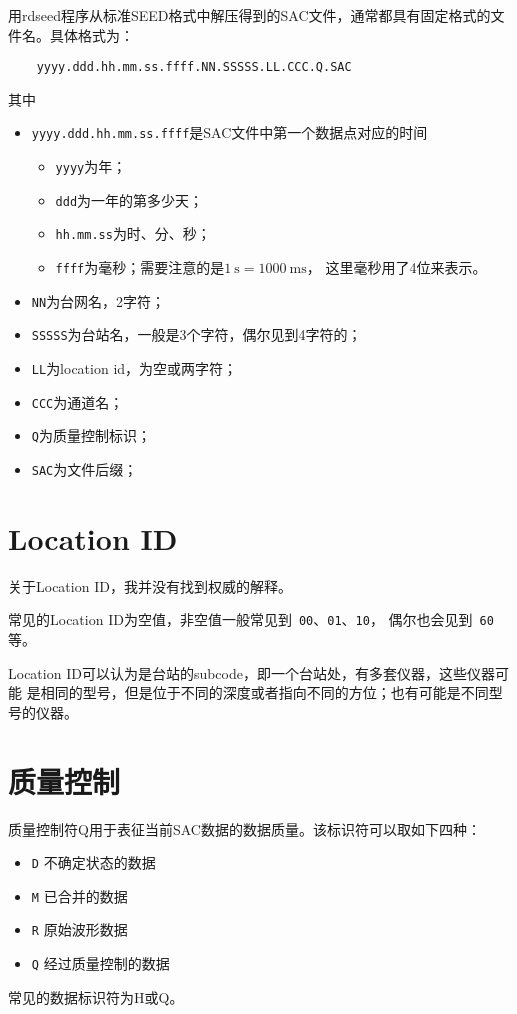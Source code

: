 用rdseed程序从标准SEED格式中解压得到的SAC文件，通常都具有固定格式的文件名。具体格式为：
\begin{verbatim}
    yyyy.ddd.hh.mm.ss.ffff.NN.SSSSS.LL.CCC.Q.SAC
\end{verbatim}
其中
\begin{itemize}
\item \verb+yyyy.ddd.hh.mm.ss.ffff+是SAC文件中第一个数据点对应的时间
    \begin{itemize}
    \item \verb+yyyy+为年；
    \item \verb+ddd+为一年的第多少天；
    \item \verb+hh.mm.ss+为时、分、秒；
    \item \verb+ffff+为毫秒；需要注意的是$\SI{1}{\s}=\SI{1000}{\ms}$，
        这里毫秒用了4位来表示。
    \end{itemize}
\item \verb+NN+为台网名，2字符；
\item \verb+SSSSS+为台站名，一般是3个字符，偶尔见到4字符的；
\item \verb+LL+为location id，为空或两字符；
\item \verb+CCC+为通道名；
\item \verb+Q+为质量控制标识；
\item \verb+SAC+为文件后缀；
\end{itemize}

\section{Location ID}
关于Location ID，我并没有找到权威的解释。

常见的Location ID为空值，非空值一般常见到~\verb+00+、\verb+01+、\verb+10+，
偶尔也会见到~\verb+60+等。

Location ID可以认为是台站的subcode，即一个台站处，有多套仪器，这些仪器可能
是相同的型号，但是位于不同的深度或者指向不同的方位；也有可能是不同型号的仪器。

\section{质量控制}
质量控制符Q用于表征当前SAC数据的数据质量。该标识符可以取如下四种：
\begin{itemize}
\item \verb+D+ 不确定状态的数据
\item \verb+M+ 已合并的数据
\item \verb+R+ 原始波形数据
\item \verb+Q+ 经过质量控制的数据
\end{itemize}
常见的数据标识符为H或Q。

